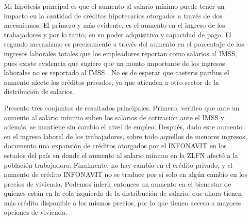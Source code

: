 
Mi hipótesis principal es que el aumento al salario mínimo puede tener un impacto en la cantidad de créditos hipotecarios otorgados a través de dos mecanismos. El primero y más evidente, es el aumento en el ingreso de los trabajadores y por lo tanto, en su poder adquisitivo y capacidad de pago. El segundo mecanismo es precisamente a través del aumento en el porcentaje de los ingresos laborales totales que los empleadores reportan como salarios al IMSS, pues existe evidencia que sugiere que un monto importante de los ingresos laborales no es reportado al IMSS \citep{kumler_verhoogen_frias_2020}. No es de esperar que caeteris paribus el aumento afecte los créditos privados, ya que atienden a otro sector de la distribución de salarios. 


Presento tres conjuntos de resultados principales. Primero, verifico que ante un aumento al salario mínimo suben los salarios de cotización ante el IMSS y además, se mantiene sin cambio el nivel de empleo. Después, dado este aumento en el ingreso laboral de los trabajadores, sobre todo aquellos de menores ingresos, documento una expansión de créditos otorgados por el INFONAVIT en los estados del país en donde el aumento al salario mínimo en la ZLFN afectó a la población trabajadora. Finalmente, no hay cambio en el crédito privado, y el aumento de crédito INFONAVIT no se traduce por sí solo en algún cambio en los precios de vivienda. Podemos inferir entonces un aumento en el bienestar de quienes están en la cola izquierda de la distribución de salario, que ahora tienen más crédito disponible a los mismos precios, por lo que tienen acceso a mayores opciones de vivienda.


